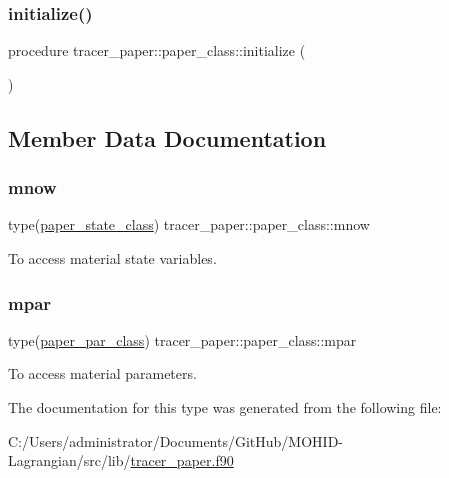 \subsubsection{\texorpdfstring{initialize()}{initialize()}}
{\footnotesize\ttfamily procedure tracer\+\_\+paper\+::paper\+\_\+class\+::initialize (\begin{DoxyParamCaption}{ }\end{DoxyParamCaption})\hspace{0.3cm}{\ttfamily [private]}}



\subsection{Member Data Documentation}
\mbox{\label{structtracer__paper_1_1paper__class_ac2b241e565b97f483d07dc132460c62f}} 
\subsubsection{\texorpdfstring{mnow}{mnow}}
{\footnotesize\ttfamily type(\hyperlink{structtracer__paper_1_1paper__state__class}{paper\+\_\+state\+\_\+class}) tracer\+\_\+paper\+::paper\+\_\+class\+::mnow\hspace{0.3cm}{\ttfamily [private]}}



To access material state variables. 

\mbox{\label{structtracer__paper_1_1paper__class_a789f1e935ab5f16f67b1859710632d45}} 
\subsubsection{\texorpdfstring{mpar}{mpar}}
{\footnotesize\ttfamily type(\hyperlink{structtracer__paper_1_1paper__par__class}{paper\+\_\+par\+\_\+class}) tracer\+\_\+paper\+::paper\+\_\+class\+::mpar\hspace{0.3cm}{\ttfamily [private]}}



To access material parameters. 



The documentation for this type was generated from the following file\+:\begin{DoxyCompactItemize}
\item 
C\+:/\+Users/administrator/\+Documents/\+Git\+Hub/\+M\+O\+H\+I\+D-\/\+Lagrangian/src/lib/\hyperlink{tracer__paper_8f90}{tracer\+\_\+paper.\+f90}\end{DoxyCompactItemize}
